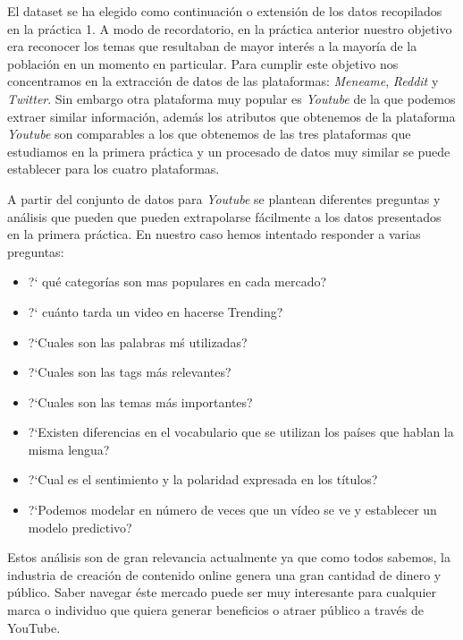\documentclass[a4paper,12pt]{article}
\begin{document}
El dataset se ha elegido como continuaci\'on o extensi\'on de los datos recopilados en la pr\'actica 1. A modo de recordatorio, en la pr\'actica anterior nuestro objetivo era reconocer los temas que resultaban de mayor inter\'es a la mayor\'ia de la poblaci\'on en un momento en particular. Para cumplir este objetivo nos concentramos en la extracci\'on de datos de las plataformas:  {\itshape Meneame}, {\itshape Reddit} y {\itshape Twitter}. Sin embargo otra plataforma muy popular es {\itshape Youtube} de la que podemos extraer similar informaci\'on, adem\'as los atributos que obtenemos de la plataforma {\itshape Youtube} son comparables a los que obtenemos de las tres plataformas que estudiamos en la primera pr\'actica y un procesado de datos muy similar se puede establecer para los cuatro plataformas.

A partir del conjunto de datos para  {\itshape Youtube}  se plantean diferentes preguntas y an\'alisis que pueden que pueden extrapolarse f\'acilmente a los datos presentados en la primera pr\'actica. En nuestro caso hemos intentado responder a varias preguntas:

\begin{itemize}

\item  ?` qu\'e categor\'ias son mas populares en cada mercado?
\item ?` cu\'anto tarda un video en hacerse Trending?
\item ?`Cuales son las palabras m\'s utilizadas?
\item ?`Cuales son las tags m\'as relevantes?
\item ?`Cuales son las temas m\'as importantes?
\item ?`Existen diferencias en el vocabulario que se utilizan los pa\'ises que hablan la misma lengua?
\item ?`Cual es el sentimiento y la polaridad expresada en los t\'itulos?
\item ?`Podemos modelar en n\'umero de veces que un v\'ideo se ve y establecer un modelo predictivo?

\end{itemize}

Estos an\'alisis son de gran relevancia actualmente ya que como todos sabemos, la industria de creaci\'on de contenido online genera una gran cantidad de dinero y p\'ublico. Saber navegar \'este mercado puede ser muy interesante para cualquier marca o individuo que quiera generar beneficios o atraer p\'ublico a trav\'es de YouTube.
\end{document}
